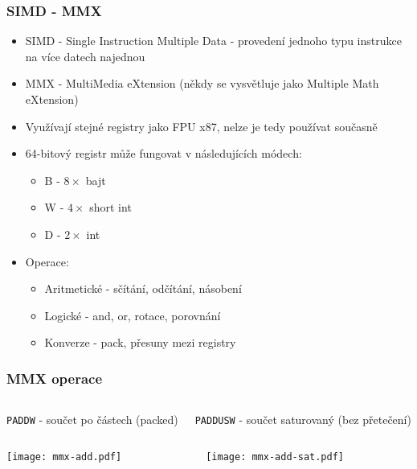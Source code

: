 \documentclass{beamer}
\begin{document}
\begin{frame}
\frametitle{SIMD - MMX}

\begin{itemize}
\item SIMD - Single Instruction Multiple Data - provedení jednoho typu instrukce na více datech najednou
\item MMX - MultiMedia eXtension (někdy se vysvětluje jako Multiple Math eXtension)
\item Využívají stejné registry jako FPU x87, nelze je tedy používat současně
\item 64-bitový registr může fungovat v následujících módech:
\begin{itemize}
\item B - $8\times$ bajt
\item W - $4\times$ short int
\item D - $2\times$ int
\end{itemize}
\item Operace: 
\begin{itemize}
\item Aritmetické - sčítání, odčítání, násobení
\item Logické - and, or, rotace, porovnání
\item Konverze - pack, přesuny mezi registry
\end{itemize}
\end{itemize}
\end{frame}

\begin{frame}
\frametitle{MMX operace}
\begin{columns}[t,onlytextwidth]
  \begin{column}{0.5\textwidth}
    \texttt{PADDW} - součet po částech (packed)
  \end{column}
  \begin{column}{0.5\textwidth}
    \texttt{PADDUSW} - součet saturovaný (bez přetečení)
  \end{column}
\end{columns}
\begin{columns}[t,onlytextwidth]
  \begin{column}{0.5\textwidth}
    \begin{center}
    \texttt{[image: mmx-add.pdf]}
    \end{center}
  \end{column}
  \begin{column}{0.5\textwidth}
    \begin{center}
    \texttt{[image: mmx-add-sat.pdf]}
    \end{center}
  \end{column}
\end{columns}

\end{frame}
\end{document}
